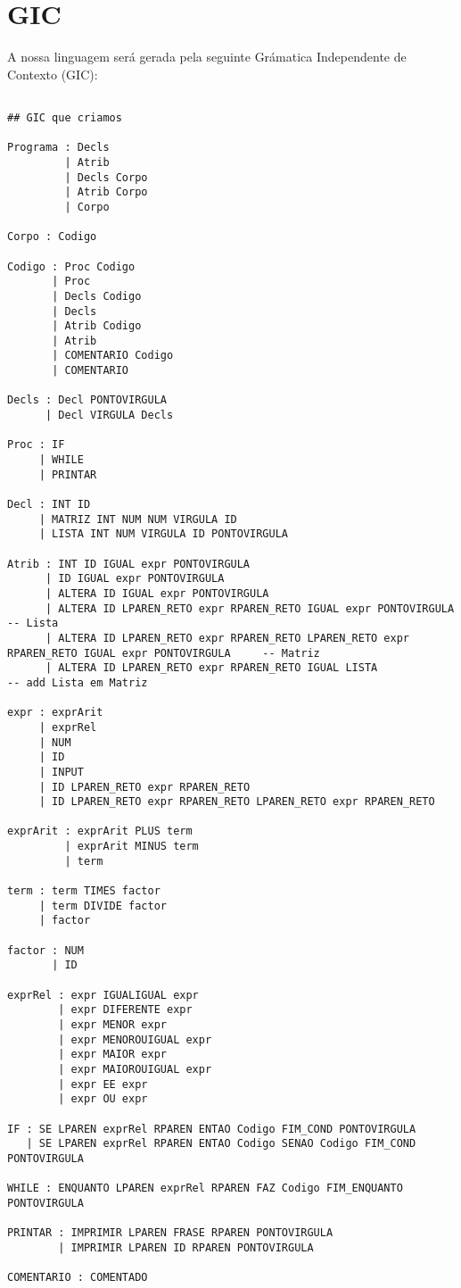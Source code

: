 \documentclass[11pt,a4paper]{report}
\begin{document}
\section{GIC}
A nossa linguagem será gerada pela seguinte Grámatica Independente de Contexto (GIC):
\begin{verbatim}

## GIC que criamos

Programa : Decls
         | Atrib
         | Decls Corpo
         | Atrib Corpo
         | Corpo

Corpo : Codigo
    
Codigo : Proc Codigo
       | Proc
       | Decls Codigo
       | Decls
       | Atrib Codigo
       | Atrib
       | COMENTARIO Codigo
       | COMENTARIO

Decls : Decl PONTOVIRGULA
      | Decl VIRGULA Decls

Proc : IF
     | WHILE
     | PRINTAR

Decl : INT ID
     | MATRIZ INT NUM NUM VIRGULA ID
     | LISTA INT NUM VIRGULA ID PONTOVIRGULA

Atrib : INT ID IGUAL expr PONTOVIRGULA
      | ID IGUAL expr PONTOVIRGULA
      | ALTERA ID IGUAL expr PONTOVIRGULA
      | ALTERA ID LPAREN_RETO expr RPAREN_RETO IGUAL expr PONTOVIRGULA                                  -- Lista
      | ALTERA ID LPAREN_RETO expr RPAREN_RETO LPAREN_RETO expr RPAREN_RETO IGUAL expr PONTOVIRGULA     -- Matriz
      | ALTERA ID LPAREN_RETO expr RPAREN_RETO IGUAL LISTA                                              -- add Lista em Matriz

expr : exprArit
     | exprRel
     | NUM
     | ID
     | INPUT
     | ID LPAREN_RETO expr RPAREN_RETO
     | ID LPAREN_RETO expr RPAREN_RETO LPAREN_RETO expr RPAREN_RETO

exprArit : exprArit PLUS term
         | exprArit MINUS term
         | term

term : term TIMES factor
     | term DIVIDE factor
     | factor

factor : NUM
       | ID

exprRel : expr IGUALIGUAL expr
        | expr DIFERENTE expr
        | expr MENOR expr
        | expr MENOROUIGUAL expr
        | expr MAIOR expr
        | expr MAIOROUIGUAL expr
        | expr EE expr
        | expr OU expr

IF : SE LPAREN exprRel RPAREN ENTAO Codigo FIM_COND PONTOVIRGULA
   | SE LPAREN exprRel RPAREN ENTAO Codigo SENAO Codigo FIM_COND PONTOVIRGULA

WHILE : ENQUANTO LPAREN exprRel RPAREN FAZ Codigo FIM_ENQUANTO PONTOVIRGULA

PRINTAR : IMPRIMIR LPAREN FRASE RPAREN PONTOVIRGULA
        | IMPRIMIR LPAREN ID RPAREN PONTOVIRGULA

COMENTARIO : COMENTADO
          
\end{verbatim}
\end{document}
